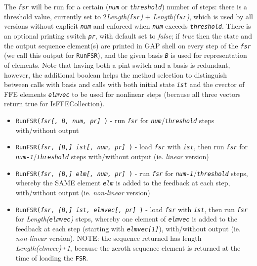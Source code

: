 \documentclass[a4paper,11pt]{report}
\begin{document}
{{{ The \mbox{\texttt{\mdseries\slshape fsr}} will be run for a certain (\mbox{\texttt{\mdseries\slshape num}} or \mbox{\texttt{\mdseries\slshape threshold}}) number of steps: there is a threshold value, currently set to
2\texttt{}\emph{Length(\mbox{\texttt{\mdseries\slshape fsr}})} + \emph{Length(\mbox{\texttt{\mdseries\slshape fsr}})}, which is used by all versions without explicit \mbox{\texttt{\mdseries\slshape num}} and enforced when \mbox{\texttt{\mdseries\slshape num}} exceeds \mbox{\texttt{\mdseries\slshape threshold}}. There is an optional printing switch \mbox{\texttt{\mdseries\slshape pr}}, with default set to \emph{false}; if \emph{true} then the state and the output sequence element(s) are printed in \textsf{GAP} shell on every step of the \mbox{\texttt{\mdseries\slshape fsr}} (we call this output for \texttt{RunFSR}), and the given basis \mbox{\texttt{\mdseries\slshape B}} is used for representation of elements. Note that having both a pint switch
and a basis is redundant, however, the additional boolean helps the method
selection to distinguish between calls with basis and calls with both initial
state \mbox{\texttt{\mdseries\slshape ist}} and the cvector of FFE elements \mbox{\texttt{\mdseries\slshape elmvec}} to be used for nonlinear steps (because all three vectors return true for
IsFFECollection). 
\begin{itemize}
\item  \texttt{RunFSR(\mbox{\texttt{\mdseries\slshape  fsr[, B, num, pr] }})} - run \mbox{\texttt{\mdseries\slshape fsr}} for \mbox{\texttt{\mdseries\slshape num}}/\mbox{\texttt{\mdseries\slshape threshold}} steps with/without output
\item  \texttt{RunFSR(\mbox{\texttt{\mdseries\slshape  fsr, [B,] ist[, num, pr] }})} - load \mbox{\texttt{\mdseries\slshape fsr}} with \mbox{\texttt{\mdseries\slshape ist}}, then run \mbox{\texttt{\mdseries\slshape fsr}} for \mbox{\texttt{\mdseries\slshape num-1}}/\mbox{\texttt{\mdseries\slshape threshold}} steps with/without output (ie. \emph{linear} version)
\item  \texttt{RunFSR(\mbox{\texttt{\mdseries\slshape  fsr, [B,] elm[, num, pr] }})} - run \mbox{\texttt{\mdseries\slshape fsr}} for \mbox{\texttt{\mdseries\slshape num-1}}/\mbox{\texttt{\mdseries\slshape threshold}} steps, whereby the SAME element \mbox{\texttt{\mdseries\slshape elm}} is added to the feedback at each step, with/without output (ie. \emph{non-linear} version)
\item  \texttt{RunFSR(\mbox{\texttt{\mdseries\slshape  fsr, [B,] ist, elmvec[, pr] }})} - load \mbox{\texttt{\mdseries\slshape fsr}} with \mbox{\texttt{\mdseries\slshape ist}}, then run \mbox{\texttt{\mdseries\slshape fsr}} for \emph{Length(\mbox{\texttt{\mdseries\slshape elmvec}})} steps, whereby one element of \mbox{\texttt{\mdseries\slshape elmvec}} is added to the feedback at each step (starting with \mbox{\texttt{\mdseries\slshape elmvec[1]}}), with/without output (ie. \emph{non-linear} version). NOTE: the sequence returned has length \emph{Length(elmvec)+1}, because the zeroth sequence element is returned at the time of loading the \texttt{FSR}.

\end{itemize}}}}
\end{document}
